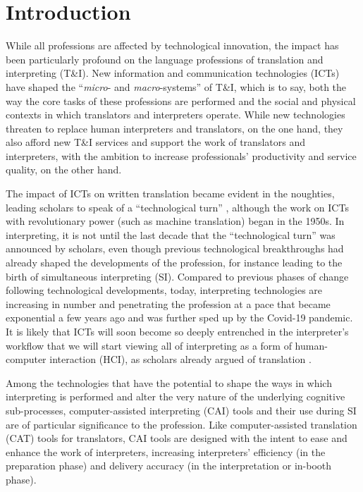 \chapter{Introduction}\label{ch:introduction}
While all professions are affected by technological innovation, the impact has been particularly profound on the language professions of translation and interpreting (T\&I). New information and communication technologies (ICTs) have shaped the ``\textit{micro}- and \textit{macro}-systems'' \citep{o2013impact} of T\&I, which is to say, both the way the core tasks of these professions are performed and the social and physical contexts in which translators and interpreters operate. While new technologies threaten to replace human interpreters and translators, on the one hand, they also afford new T\&I services and support the work of translators and interpreters, with the ambition to increase professionals’ productivity and service quality, on the other hand.

The impact of ICTs on written translation became evident in the noughties, leading scholars to speak of a ``technological turn'' \citep{chan2007taking,cronin2010translation,o2013impact}, although the work on ICTs with revolutionary power (such as machine translation) began in the 1950s. In interpreting, it is not until the last decade that the ``technological turn'' \citep{fantinuoli2018a} was announced by scholars, even though previous technological breakthroughs had already shaped the developments of the profession, for instance leading to the birth of simultaneous interpreting (SI). Compared to previous phases of change following technological developments, today, interpreting technologies are increasing in number and penetrating the profession at a pace that became exponential a few years ago \citep{fantinuoli2018a} and was further sped up by the Covid-19 pandemic. It is likely that ICTs will soon become so deeply entrenched in the interpreter’s workflow that we will start viewing all of interpreting as a form of human-computer interaction (HCI), as scholars already argued of translation \citep{o2012translation}.

Among the technologies that have the potential to shape the ways in which interpreting is performed and alter the very nature of the underlying cognitive sub-processes, computer-assisted interpreting (CAI) tools and their use during SI are of particular significance to the profession. Like computer-assisted translation (CAT) tools for translators, CAI tools are designed with the intent to ease and enhance the work of interpreters, increasing interpreters’ efficiency (in the preparation phase) and delivery accuracy (in the interpretation or in-booth phase).

